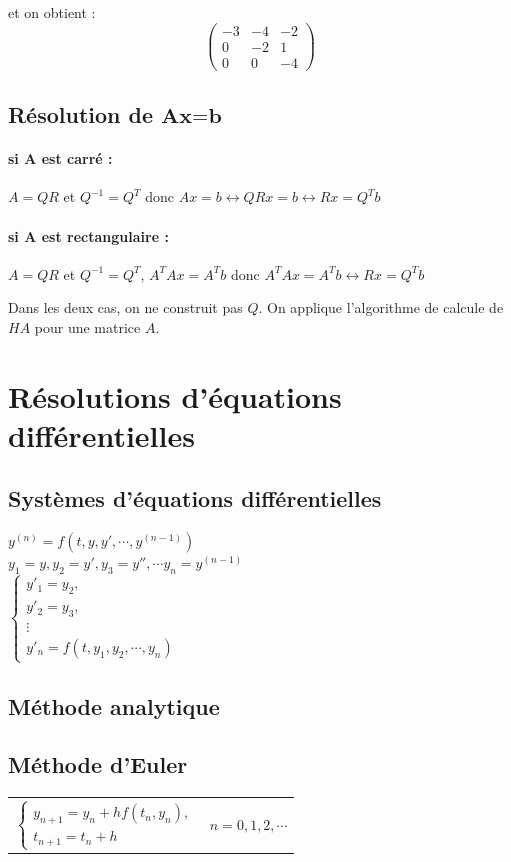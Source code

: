 \documentclass[a4paper,9pt]{extarticle}
\begin{document}
\begin{multicols*}{2}
et on obtient :
$$
\begin{pmatrix}
-3 & -4 & -2 \\
0 & -2 & 1 \\
0 & 0 & -4
\end{pmatrix}
$$

\subsection{Résolution de $\textbf{Ax=b}$}

\paragraph*{si \textbf{A} est carré : } $A=QR$ et $Q^{-1}=Q^T$ donc $Ax=b \leftrightarrow QRx = b \leftrightarrow Rx = Q^Tb$
\paragraph*{si \textbf{A} est rectangulaire : } $A=QR$ et $Q^{-1}=Q^T$, $A^TAx=A^Tb$ donc $A^TAx=A^Tb\leftrightarrow Rx = Q^Tb$

Dans les deux cas, on ne construit pas $Q$. On applique l'algorithme de calcule de $HA$ pour une matrice $A$.

\section{Résolutions d'équations différentielles}

\subsection{Systèmes d'équations différentielles}
$y^{(n)} = f(t,y,y',\cdots,y^{(n-1)})$\\
$y_1=y,y_2=y',y_3=y'', \cdots y_n = y^{(n-1)}$\\
$
\begin{cases}
	y'_1 = y_2,\\
	y'_2 = y_3, \\
	\vdots\\
	y'_n=f(t,y_1,y_2,\cdots,y_n)
\end{cases}
$
\subsection{Méthode analytique}
\subsection{Méthode d'Euler}
\begin{tabular}{ll}
$
\begin{cases}
y_{n+1} = y_n + hf(t_n,y_n), \\
t_{n+1} = t_n + h
\end{cases}
$
&
$n=0,1,2,\cdots$
\end{tabular}

\end{multicols*}
\end{document}
